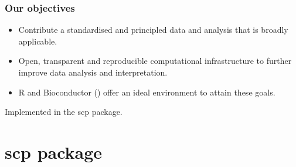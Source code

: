 \documentclass{beamer}
\newcommand{\hcode}[2][lgray]{{\ttfamily\color{vdgray}\colorbox{#1}{#2}}}
\newcommand{\frametitlesection}[1]{\frametitle{\centering #1 \footnotesize \hspace{0pt plus 1 filll} \insertsection}}
\begin{document}
\begin{frame}
    \frametitlesection{Our objectives}

    \begin{itemize}
    \item Contribute a standardised and principled data and analysis
      that is broadly applicable.

    \item Open, transparent and reproducible computational
      infrastructure to further improve data analysis and
      interpretation.

    \item R and Bioconductor (\citet{Huber2015-sn}) offer an ideal
      environment to attain these goals.

    \end{itemize}

    \bigskip

    Implemented in the \hcode{scp} package.

\end{frame}



\section{scp package}
\end{document}
